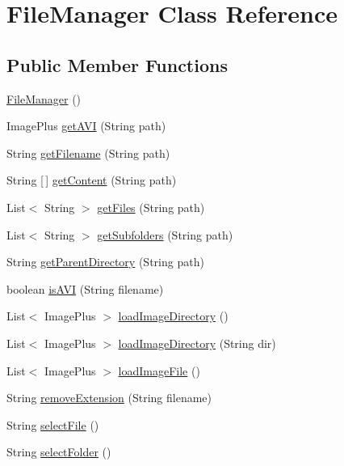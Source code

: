 \hypertarget{classfunctions_1_1_file_manager}{}\section{File\+Manager Class Reference}
\label{classfunctions_1_1_file_manager}
\subsection*{Public Member Functions}
\begin{DoxyCompactItemize}
\item 
\hyperlink{classfunctions_1_1_file_manager_a0ad324c611d51ae061bcf3105c84aef0}{File\+Manager} ()
\item 
Image\+Plus \hyperlink{classfunctions_1_1_file_manager_a140fc635f053a614aecddfb79baf5905}{get\+A\+VI} (String path)
\item 
String \hyperlink{classfunctions_1_1_file_manager_ad027758f34214960a7aa800e0f7c19db}{get\+Filename} (String path)
\item 
String \mbox{[}$\,$\mbox{]} \hyperlink{classfunctions_1_1_file_manager_a8d912a4b181b284e6c05e0f44f541e48}{get\+Content} (String path)
\item 
List$<$ String $>$ \hyperlink{classfunctions_1_1_file_manager_a3a54a5574abfddd928b2b8675e8affa6}{get\+Files} (String path)
\item 
List$<$ String $>$ \hyperlink{classfunctions_1_1_file_manager_a73efd872c86ccdce535ddb2798aaaea4}{get\+Subfolders} (String path)
\item 
String \hyperlink{classfunctions_1_1_file_manager_aa9e15d838c5a7a0e3906d9ceec253398}{get\+Parent\+Directory} (String path)
\item 
boolean \hyperlink{classfunctions_1_1_file_manager_aef15c5bfadc70a7333a3103e85e7bf65}{is\+A\+VI} (String filename)
\item 
List$<$ Image\+Plus $>$ \hyperlink{classfunctions_1_1_file_manager_a0f8b52da290ba020437d01d4873b1d2c}{load\+Image\+Directory} ()
\item 
List$<$ Image\+Plus $>$ \hyperlink{classfunctions_1_1_file_manager_ae7538dc1fbe0b999be0a86e196de6851}{load\+Image\+Directory} (String dir)
\item 
List$<$ Image\+Plus $>$ \hyperlink{classfunctions_1_1_file_manager_a10f7f3b24be48586ca7455ebac6abcd7}{load\+Image\+File} ()
\item 
String \hyperlink{classfunctions_1_1_file_manager_a4053142396d8fa1e3d2a2c1974952124}{remove\+Extension} (String filename)
\item 
String \hyperlink{classfunctions_1_1_file_manager_aa741a9e7ac4127ae1a463fb626474edf}{select\+File} ()
\item 
String \hyperlink{classfunctions_1_1_file_manager_af19fd6734ccb746c4f276c83b6a47689}{select\+Folder} ()
\end{DoxyCompactItemize}



